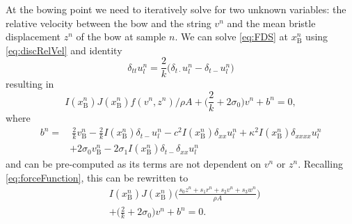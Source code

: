 \documentclass[twoside,a4paper,dvipsnames]{article}
\def\SBcomment[#1]{\textcolor{Red}{#1}}
\def\SWcomment[#1]{\textcolor{Green}{#1}}
\begin{document}
At the bowing point we need to iteratively solve for two unknown variables: the relative velocity between the bow and the string $v^n$ and the mean bristle displacement $z^n$ of the bow at sample $n$.
We can solve \eqref{eq:FDS} at $x_\text{B}^n$ using \eqref{eq:discRelVel} and identity \cite{Bilbao2009}
\begin{equation}
    \delta_{tt}u_l^n = \frac{2}{k}\big(\delta_{t\cdot}u_l^n-\delta_{t-}u_l^n\big)
\end{equation}
resulting in 
\begin{equation} \label{eq:incIdentity}
    I(x_\text{B}^n)J(x_\text{B}^n)f(v^n,z^n)/\rho A+\Big(\frac{2}{k}+2\sigma_{0}\Big) v^n+b^n = 0,
\end{equation}
where 
\begin{equation}\label{eq:bn}
        \begin{aligned}b^n =& \: \frac{2}{k}v_\text{B}^n-\frac{2}{k}I(x_\text{B}^n)\delta_{t-}u_l^n - c^2 I(x_\text{B}^n)\delta_{xx} u_l^n +\kappa^2I(x_\text{B}^n)\delta_{xxxx} u_l^n \\
    &+ 2\sigma_0v_\text{B}^n -2\sigma_1I(x_\text{B}^n)\delta_{t-}\delta_{xx}u_l^n
\end{aligned}
\end{equation}
and can be pre-computed as its terms are not dependent on $v^n$ or $z^n$. Recalling \eqref{eq:forceFunction}, this can be rewritten to
\begin{equation}\label{eq:newtonFunction}
\begin{aligned}
    &I(x_\text{B}^n)J(x_\text{B}^n)\Bigg(\frac{s_0z^n+s_1r^n+s_2v^n+s_3w^n}{\rho A}
    \Bigg)\\
    &+\Big(\frac{2}{k} + 2\sigma_0 \Big)v^n+ b^n= 0.
    \end{aligned}
\end{equation}
\end{document}

